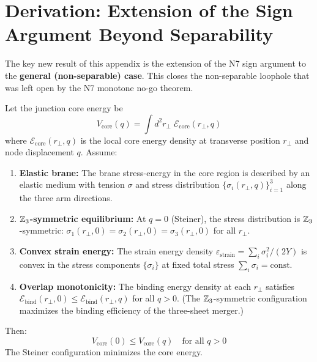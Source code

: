 \section{Derivation: Extension of the Sign Argument Beyond Separability}
\label{sec:NMCP:derivation}

The key new result of this appendix is the extension of the N7 sign
argument to the \textbf{general (non-separable) case}. This closes the
non-separable loophole that was left open by the N7 monotone no-go
theorem.

\begin{theorem}
\label{thm:NMCP_general_sign}
Let the junction core energy be
\begin{equation}
    V_{\mathrm{core}}(q) = \int d^2 r_\perp\;
    \mathcal{E}_{\mathrm{core}}(r_\perp, q)
    \label{eq:NMCP_general_Vcore}
\end{equation}
where $\mathcal{E}_{\mathrm{core}}(r_\perp, q)$ is the local core
energy density at transverse position $r_\perp$ and node displacement
$q$. Assume:
\begin{enumerate}
    \item[(A)] \textbf{Elastic brane:} The brane stress-energy in the
          core region is described by an elastic medium with tension
          $\sigma$ and stress distribution $\{\sigma_i(r_\perp, q)\}_{i=1}^3$
          along the three arm directions.
    \item[(B)] \textbf{$\mathbb{Z}_3$-symmetric equilibrium:} At $q = 0$
          (Steiner), the stress distribution is $\mathbb{Z}_3$-symmetric:
          $\sigma_1(r_\perp, 0) = \sigma_2(r_\perp, 0)
          = \sigma_3(r_\perp, 0)$ for all $r_\perp$.
    \item[(C)] \textbf{Convex strain energy:} The strain energy density
          $\varepsilon_{\mathrm{strain}} = \sum_i \sigma_i^2 / (2Y)$
          is convex in the stress components $\{\sigma_i\}$ at fixed
          total stress $\sum_i \sigma_i = \mathrm{const}$.
    \item[(D)] \textbf{Overlap monotonicity:} The binding energy density
          at each $r_\perp$ satisfies
          $\mathcal{E}_{\mathrm{bind}}(r_\perp, 0) \leq
          \mathcal{E}_{\mathrm{bind}}(r_\perp, q)$ for all $q > 0$.
          (The $\mathbb{Z}_3$-symmetric configuration maximizes the binding
          efficiency of the three-sheet merger.)
\end{enumerate}
Then:
\begin{equation}
    V_{\mathrm{core}}(0) \leq V_{\mathrm{core}}(q)
    \quad \text{for all } q > 0
    \label{eq:NMCP_general_sign_result}
\end{equation}
The Steiner configuration minimizes the core energy.
\end{theorem}

